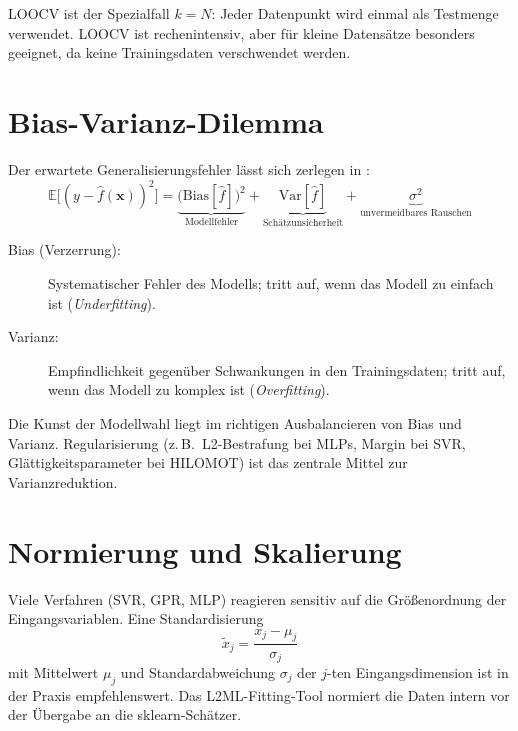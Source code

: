 \documentclass[11pt,a4paper]{report}
\begin{document}
LOOCV ist der Spezialfall $k = N$: Jeder Datenpunkt wird einmal als Testmenge verwendet.
LOOCV ist rechenintensiv, aber f\"{u}r kleine Datens\"{a}tze besonders geeignet, da keine
Trainingsdaten verschwendet werden.

\section{Bias-Varianz-Dilemma}
\label{sec:bias_varianz}

Der erwartete Generalisierungsfehler l\"{a}sst sich zerlegen in \cite{bishop2006, hastie2009}:
\begin{equation}
\mathbb{E}\bigl[(y-\hat{f}(\mathbf{x}))^2\bigr]
= \underbrace{\bigl(\mathrm{Bias}[\hat{f}]\bigr)^2}_{\text{Modellfehler}}
+ \underbrace{\mathrm{Var}[\hat{f}]}_{\text{Sch\"{a}tzunsicherheit}}
+ \underbrace{\sigma^2}_{\text{unvermeidbares Rauschen}}
\label{eq:bias_varianz}
\end{equation}

\begin{description}
\item[Bias (Verzerrung):] Systematischer Fehler des Modells; tritt auf, wenn das Modell zu
    einfach ist (\emph{Underfitting}).
\item[Varianz:] Empfindlichkeit gegen\"{u}ber Schwankungen in den Trainingsdaten; tritt auf,
    wenn das Modell zu komplex ist (\emph{Overfitting}).
\end{description}

\begin{merkbox}
Die Kunst der Modellwahl liegt im richtigen Ausbalancieren von Bias und Varianz.
Regularisierung (z.\,B.\ L2-Bestrafung bei MLPs, Margin bei SVR, Gl\"{a}ttigkeitsparameter bei
HILOMOT) ist das zentrale Mittel zur Varianzreduktion.
\end{merkbox}

\section{Normierung und Skalierung}

Viele Verfahren (SVR, GPR, MLP) reagieren sensitiv auf die Gr\"{o}\ss{}enordnung der
Eingangsvariablen. Eine Standardisierung
\begin{equation}
\tilde{x}_j = \frac{x_j - \mu_j}{\sigma_j}
\end{equation}
mit Mittelwert $\mu_j$ und Standardabweichung $\sigma_j$ der $j$-ten Eingangsdimension ist
in der Praxis empfehlenswert. Das L2ML-Fitting-Tool normiert die Daten intern vor der \"{U}bergabe an die
sklearn-Sch\"{a}tzer.
\end{document}
